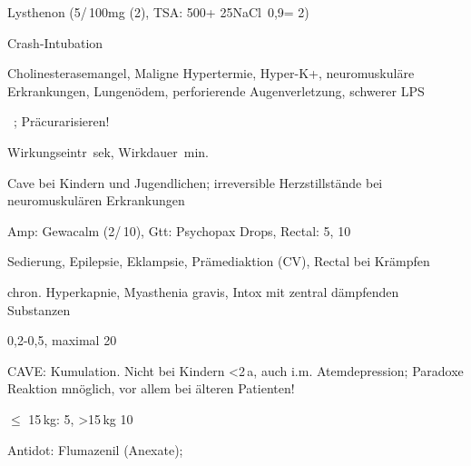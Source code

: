 {
\begin{MedikamentCharakteristika}
  \item[{\TxItemSpezialitaeten}] 
  Lysthenon{\texttrademark} 
  (5\Ml*/\,100mg (2\PC*), 
  TSA: 500\Mg* + 25\Ml* NaCl~0,9\PC* = 2\PC*)
  \item[Beschreibung]
  \item[{\TxItemIndikation}] Crash-Intubation
  \item[{\TxItemKontraindikation}] 
  Cholinesterasemangel, 
  Maligne Hypertermie, 
  Hyper-K+, 
  neuromuskuläre Erkrankungen, 
  Lungenödem, 
  perforierende Augenverletzung, 
  schwerer LPS
  \item[{\TxItemAnmerkung}] \item[{\TxItemDosierung}] 
  ~\MgKg*;
  Präcurarisieren!


  Wirkungseintr \,sek, 
  Wirkdauer \,min.
  \item[{\TxItemCave}] Cave bei Kindern und Jugendlichen; 
  irreversible Herzstillstände bei neuromuskulären Erkrankungen
\end{MedikamentCharakteristika}}
{}





{
\begin{MedikamentCharakteristika}
  \item[{\TxItemSpezialitaeten}] Amp: Gewacalm{\texttrademark} 
  (2\Ml*/\,10\Mg*), Gtt: 
  Psychopax Drops,
  Rectal: 5\Mg, 10\Mg
  \item[Beschreibung]
  \item[{\TxItemIndikation}] 
  Sedierung, 
  Epilepsie, 
  Eklampsie, 
  Prämediaktion (CV), 
  Rectal bei Krämpfen
  \item[{\TxItemKontraindikation}] chron. Hyperkapnie, Myasthenia 
  gravis, Intox mit zentral dämpfenden Substanzen
  \item[Rx i.V.]  0,2-0,5\MgKg*, maximal 20\Mg
  \item[{\TxItemCave}] CAVE: Kumulation. Nicht bei Kindern 
  {\textless}2\,a, auch i.m. Atemdepression; Paradoxe Reaktion 
  mnöglich, vor allem bei älteren Patienten!
  \item[Rx rect.] $\leq$ 15\,kg: 5\Mg, {\textgreater}15\,kg 10\Mg
  \item[{\TxItemAnmerkung}] Antidot: Flumazenil (Anexate); 
\end{MedikamentCharakteristika}}
{}



